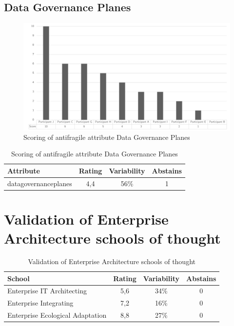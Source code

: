 \subsection{Data Governance Planes}
\begin{figure}[H]
	\centering
	\includegraphics[width=0.9\linewidth]{images/scoreafdatagovernanceplanes}
	\caption[Scoring of antifragile attribute Data Governance Planes]{Scoring of antifragile attribute Data Governance Planes}
	\label{fig:appscoringafdatagovernanceplanes}
\end{figure}
\begin{table}[H]
	\centering
	\begin{tabular}{p{}ccc}
		\toprule
			\textbf{Attribute} &\textbf{Rating} & \textbf{Variability} & \textbf{Abstains} \\
		\midrule
		\Gls{datagovernanceplanes} & 4,4 & 56\% & 1 \\%
		\bottomrule
	\end{tabular}%
	\caption[Scoring of antifragile attribute Data Governance Planes]{Scoring of antifragile attribute Data Governance Planes}
	\label{tab:appscoringafdatagovernance}
\end{table}%
\newpage
\section{Validation of Enterprise Architecture schools of thought}
\label{sec:validationofeaschools}
\begin{table}[H]
	\centering
	\begin{tabular}{p{}ccc}
		\toprule
		\textbf{School} & \textbf{Rating} & \textbf{Variability} & \textbf{Abstains} \\
		\midrule
		Enterprise IT Architecting & 5,6 & 34\% & 0 \\%
		Enterprise Integrating & 7,2 & 16\% & 0 \\%
		Enterprise Ecological Adaptation & 8,8 & 27\% & 0 \\%
		\bottomrule
	\end{tabular}%
	\caption{Validation of Enterprise Architecture schools of thought}
	\label{tab:appvalidationofeaschools}%
\end{table}%
